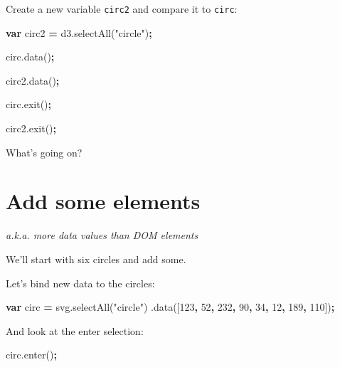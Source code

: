 \documentclass[openany]{book}
\newenvironment{Shaded}{\begin{snugshade}}{\end{snugshade}}
\newcommand{\AttributeTok}[1]{\textcolor[rgb]{0.77,0.63,0.00}{#1}}
\newcommand{\DecValTok}[1]{\textcolor[rgb]{0.00,0.00,0.81}{#1}}
\newcommand{\KeywordTok}[1]{\textcolor[rgb]{0.13,0.29,0.53}{\textbf{#1}}}
\newcommand{\NormalTok}[1]{#1}
\newcommand{\OperatorTok}[1]{\textcolor[rgb]{0.81,0.36,0.00}{\textbf{#1}}}
\newcommand{\StringTok}[1]{\textcolor[rgb]{0.31,0.60,0.02}{#1}}
\newcommand{\VariableTok}[1]{\textcolor[rgb]{0.00,0.00,0.00}{#1}}
\begin{document}
Create a new variable \texttt{circ2} and compare it to \texttt{circ}:

\begin{Shaded}
\begin{Highlighting}[]
\KeywordTok{var}\NormalTok{ circ2 }\OperatorTok{=} \VariableTok{d3}\NormalTok{.}\AttributeTok{selectAll}\NormalTok{(}\StringTok{"circle"}\NormalTok{)}\OperatorTok{;}

\VariableTok{circ}\NormalTok{.}\AttributeTok{data}\NormalTok{()}\OperatorTok{;}

\VariableTok{circ2}\NormalTok{.}\AttributeTok{data}\NormalTok{()}\OperatorTok{;}

\VariableTok{circ}\NormalTok{.}\AttributeTok{exit}\NormalTok{()}\OperatorTok{;}

\VariableTok{circ2}\NormalTok{.}\AttributeTok{exit}\NormalTok{()}\OperatorTok{;}
\end{Highlighting}
\end{Shaded}

What's going on?

\hypertarget{add-some-elements}{%
\section{Add some elements }\label{add-some-elements}}

\emph{a.k.a. more data values than DOM elements}

We'll start with six circles and add some.

Let's bind new data to the circles:

\begin{Shaded}
\begin{Highlighting}[]
\KeywordTok{var}\NormalTok{ circ }\OperatorTok{=} \VariableTok{svg}\NormalTok{.}\AttributeTok{selectAll}\NormalTok{(}\StringTok{"circle"}\NormalTok{)}
\NormalTok{      .}\AttributeTok{data}\NormalTok{([}\DecValTok{123}\OperatorTok{,} \DecValTok{52}\OperatorTok{,} \DecValTok{232}\OperatorTok{,} \DecValTok{90}\OperatorTok{,} \DecValTok{34}\OperatorTok{,} \DecValTok{12}\OperatorTok{,} \DecValTok{189}\OperatorTok{,} \DecValTok{110}\NormalTok{])}\OperatorTok{;}
\end{Highlighting}
\end{Shaded}

And look at the enter selection:

\begin{Shaded}
\begin{Highlighting}[]
\VariableTok{circ}\NormalTok{.}\AttributeTok{enter}\NormalTok{()}\OperatorTok{;}
\end{Highlighting}
\end{Shaded}
\end{document}

